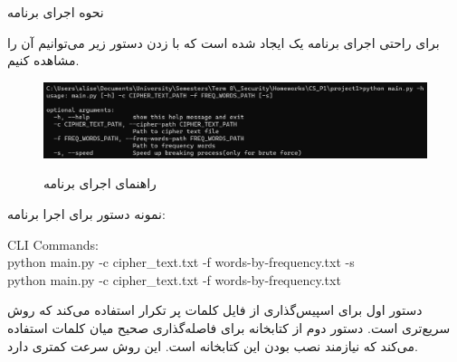 \Problem
{نحوه اجرای برنامه}
{
برای راحتی اجرای برنامه یک
ایجاد شده است که با زدن دستور زیر می‌توانیم آن را مشاهده کنیم.


\begin{figure}[H]
    \centering
    \includegraphics[width=15cm]{Images/Help.jpg}
    \label{fig:label}
    \caption{راهنمای اجرای برنامه}
\end{figure}

نمونه دستور برای اجرا برنامه:

\begin{latin}
    CLI Commands:\\
    python main.py -c cipher\_text.txt -f words-by-frequency.txt -s\\
    python main.py -c cipher\_text.txt -f words-by-frequency.txt\\
\end{latin}

دستور اول برای اسپیس‌گذاری از فایل کلمات پر تکرار استفاده می‌کند که روش سریع‌تری است.
دستور دوم از کتابخانه
برای فاصله‌گذاری صحیح میان کلمات استفاده می‌کند که نیازمند نصب بودن این کتابخانه است. این روش سرعت کمتری دارد.
}

